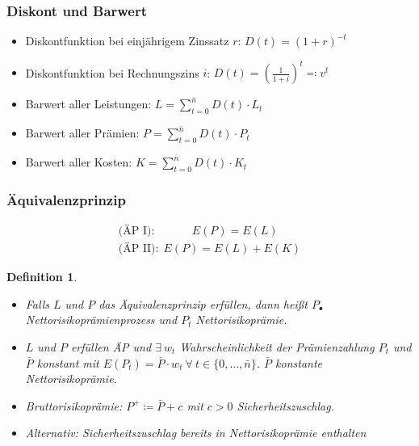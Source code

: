 \documentclass[12pt]{report}
\theoremstyle{dotless}
\newtheorem{defn}[thm]{Definition}
\theoremstyle{definition}
\begin{document}
\subsubsection{Diskont und Barwert}
\begin{itemize}
	\item Diskontfunktion bei einjährigem Zinssatz $r$: $D(t)=(1+r)^{-t}$
	\item Diskontfunktion bei Rechnungszins $i$: $D(t) = (\frac{1}{1+i})^t \eqqcolon v^t$
	\item Barwert aller Leistungen: $L=\sum_{t=0}^{\bar{n}}D(t)\cdot L_t$
	\item Barwert aller Prämien: $P=\sum_{t=0}^{\bar{n}}D(t)\cdot P_t$
	\item Barwert aller Kosten: $K=\sum_{t=0}^{\bar{n}}D(t)\cdot K_t$
\end{itemize}

\subsubsection{Äquivalenzprinzip}
\begin{align}
	\text{(ÄP I):} \ \ \ \ \ \ \ \ \ \ \ \ \ \ \ E(P)=E(L) \\
	\text{(ÄP II):} \ \ E(P)=E(L)+E(K)
\end{align} 

\begin{defn} \ \\
	\begin{itemize}
		\item Falls $L$ und $P$ das Äquivalenzprinzip erfüllen, dann hei{\ss}t $P_{\bullet}$ Nettorisikoprämienprozess und $P_t$ Nettorisikoprämie.
		\item $L$ und $P$ erfüllen ÄP und $\exists \ w_t$ Wahrscheinlichkeit der Prämienzahlung $P_t$ und $\bar{P}$ konstant mit $E(P_t)=\bar{P}\cdot w_t \ \forall \ t \in \{0,...,\bar{n}\}$. $\bar{P}$ konstante Nettorisikoprämie.
		\item Bruttorisikoprämie: $P^+ \coloneqq \bar{P}+c$ mit $c>0$ Sicherheitszuschlag.
		\item Alternativ: Sicherheitszuschlag bereits in Nettorisikoprämie enthalten
	\end{itemize}
\end{defn}
\end{document}
